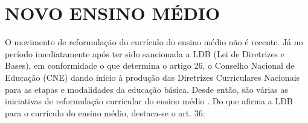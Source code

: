 



\section{NOVO ENSINO MÉDIO}

O movimento de reformulação do currículo do ensino médio não é recente. Já no período imediatamente após ter sido sancionada a LDB (Lei de Diretrizes e Bases), em conformidade o que determina o artigo 26, o Conselho Nacional de Educação (CNE) dando início à produção das Diretrizes Curriculares Nacionais para as etapas e modalidades da educação básica. Desde então, são várias as iniciativas de reformulação curricular do ensino médio \cite{lei9394}. Do que afirma a LDB para o currículo do ensino médio, destaca-se o art. 36:

